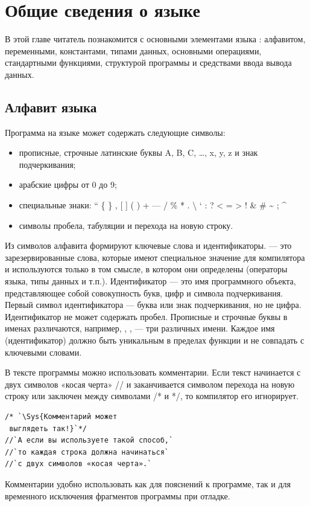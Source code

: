 \chapter[Общие сведения о языке \Sys{С++}]{Общие сведения о языке }\label{gl02}
В этой главе читатель познакомится с основными элементами языка : алфавитом, переменными, константами, типами данных,
основными операциями, стандартными функциями, структурой программы и средствами ввода вывода данных.

\section[Алфавит языка]{Алфавит языка}
Программа на языке  может содержать следующие символы:
\begin{itemize}
\item прописные, строчные латинские буквы A, B, C, …, x, y, z и знак подчеркивания;
\item арабские цифры от 0 до 9;
\item специальные знаки: “ \{ \} , {\textbar} [ ] ( ) + --- / \% * . {\textbackslash} ‘ : ? {\textless} = {\textgreater} !
\& \# \~{} ; \^{}
\item символы пробела, табуляции и перехода на новую строку.
\end{itemize}
Из символов алфавита формируют ключевые слова и идентификаторы. 
 --- это зарезервированные слова, которые имеют специальное значение для компилятора и используются только в том смысле, в
котором они определены (операторы языка, типы данных и т.п.). Идентификатор ---
это имя программного объекта, представляющее собой совокупность букв, цифр и символа подчеркивания. Первый символ
идентификатора --- буква или знак подчеркивания, но не цифра. Идентификатор не может содержать пробел. Прописные и
строчные буквы в именах различаются, например, , ,  --- 
три различных имени. Каждое имя (идентификатор) должно быть уникальным в пределах функции и не совпадать с ключевыми
словами. 

В тексте программы можно использовать комментарии. Если текст начинается с двух
символов «косая черта» // и заканчивается символом перехода на новую строку или заключен между
символами /* и */, то компилятор его игнорирует. 

\begin{lstlisting}
/* `\Sys{Комментарий может
 выглядеть так!}`*/
//`А если вы используете такой способ,`
//`то каждая строка должна начинаться`
//`с двух символов «косая черта».`
\end{lstlisting}
Комментарии удобно использовать как для пояснений к программе, так и для временного исключения фрагментов программы при
отладке.

